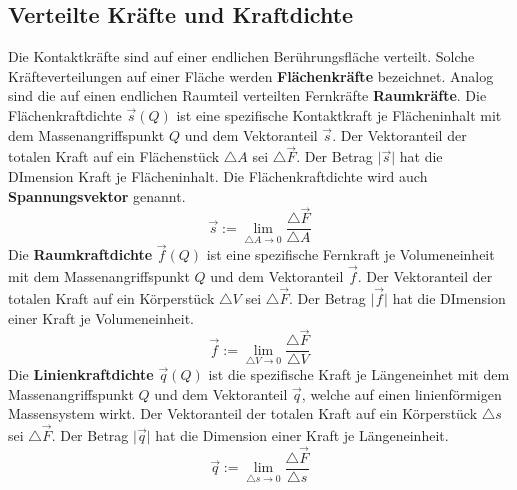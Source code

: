 \subsection{Verteilte Kräfte und Kraftdichte} 
Die Kontaktkräfte sind auf einer endlichen Berührungsfläche verteilt. Solche Kräfteverteilungen auf einer Fläche werden \textbf{Flächenkräfte} bezeichnet. Analog sind die auf einen endlichen Raumteil verteilten Fernkräfte \textbf{Raumkräfte}.
\newline\newline
Die Flächenkraftdichte $\overrightarrow{s}\left(Q\right)$ ist eine spezifische Kontaktkraft je Flächeninhalt mit dem Massenangriffspunkt $Q$ und dem Vektoranteil $\overrightarrow{s}$. Der Vektoranteil der totalen Kraft auf ein Flächenstück $\triangle A$ sei $\triangle \overrightarrow{F}$. Der Betrag $\Big\vert\overrightarrow{s}\Big\vert$ hat die DImension Kraft je Flächeninhalt. Die Flächenkraftdichte wird auch \textbf{Spannungsvektor} genannt.
\begin{equation}
\boxed{\overrightarrow{s}:=\displaystyle \lim_{\triangle A\rightarrow 0} \dfrac{\triangle \overrightarrow{F}}{\triangle A}}
\end{equation}
Die \textbf{Raumkraftdichte} $\overrightarrow{f}\left(Q\right)$ ist eine spezifische Fernkraft je Volumeneinheit mit dem Massenangriffspunkt $Q$ und dem Vektoranteil $\overrightarrow{f}$. Der Vektoranteil der totalen Kraft auf ein Körperstück $\triangle V$ sei $\triangle \overrightarrow{F}$. Der Betrag $\Big\vert\overrightarrow{f}\Big\vert$ hat die DImension einer Kraft je Volumeneinheit.
\begin{equation}
\boxed{\overrightarrow{f}:=\displaystyle \lim_{\triangle V\rightarrow 0} \dfrac{\triangle \overrightarrow{F}}{\triangle V}}
\end{equation}
Die \textbf{Linienkraftdichte} $\overrightarrow{q}\left(Q\right)$ ist die spezifische Kraft je Längeneinhet mit dem Massenangriffspunkt $Q$ und dem Vektoranteil $\overrightarrow{q}$, welche auf einen linienförmigen Massensystem wirkt. Der Vektoranteil der totalen Kraft auf ein Körperstück $\triangle s$ sei $\triangle \overrightarrow{F}$. Der Betrag $\Big\vert\overrightarrow{q}\Big\vert$ hat die Dimension einer Kraft je Längeneinheit.  
\begin{equation}
\boxed{\overrightarrow{q}:=\displaystyle \lim_{\triangle s\rightarrow 0} \dfrac{\triangle \overrightarrow{F}}{\triangle s}}
\end{equation}